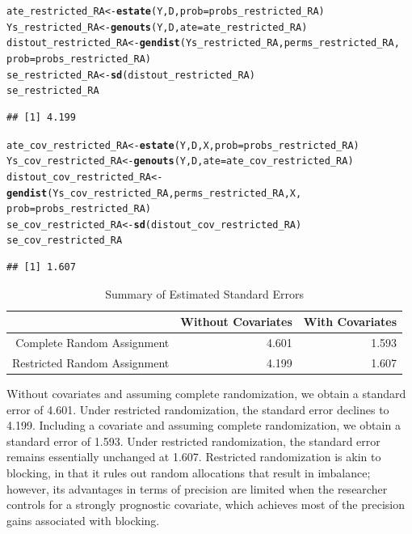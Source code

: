 \documentclass[11pt,notitlepage]{article}\usepackage[]{graphicx}\usepackage[]{color}
\makeatletter
\newcommand{\hlstd}[1]{\textcolor[rgb]{0.345,0.345,0.345}{#1}}%
\newcommand{\hlkwb}[1]{\textcolor[rgb]{0.69,0.353,0.396}{#1}}%
\newcommand{\hlkwc}[1]{\textcolor[rgb]{0.333,0.667,0.333}{#1}}%
\newcommand{\hlkwd}[1]{\textcolor[rgb]{0.737,0.353,0.396}{\textbf{#1}}}%
\newenvironment{kframe}{%
 \def\at@end@of@kframe{}%
 \ifinner\ifhmode%
  \def\at@end@of@kframe{\end{minipage}}%
  \begin{minipage}{\columnwidth}%
 \fi\fi%
 \def\FrameCommand##1{\hskip\@totalleftmargin \hskip-\fboxsep
 \colorbox{shadecolor}{##1}\hskip-\fboxsep
     \hskip-\linewidth \hskip-\@totalleftmargin \hskip\columnwidth}%
 \MakeFramed {\advance\hsize-\width
   \@totalleftmargin\z@ \linewidth\hsize
   \@setminipage}}%
 {\par\unskip\endMakeFramed%
 \at@end@of@kframe}
\newenvironment{knitrout}{}{} %
\makeatother
\begin{document}
\begin{enumerate}[a)]
\begin{knitrout}
\begin{kframe}
\begin{alltt}
\hlstd{ate_restricted_RA} \hlkwb{<-} \hlkwd{estate}\hlstd{(Y,D,}\hlkwc{prob}\hlstd{=probs_restricted_RA)}
\hlstd{Ys_restricted_RA} \hlkwb{<-} \hlkwd{genouts}\hlstd{(Y,D,}\hlkwc{ate}\hlstd{=ate_restricted_RA)}
\hlstd{distout_restricted_RA} \hlkwb{<-} \hlkwd{gendist}\hlstd{(Ys_restricted_RA,perms_restricted_RA,}
                                 \hlkwc{prob}\hlstd{=probs_restricted_RA)}
\hlstd{se_restricted_RA} \hlkwb{<-} \hlkwd{sd}\hlstd{(distout_restricted_RA)}
\hlstd{se_restricted_RA}
\end{alltt}
\begin{verbatim}
## [1] 4.199
\end{verbatim}
\begin{alltt}
\hlstd{ate_cov_restricted_RA} \hlkwb{<-} \hlkwd{estate}\hlstd{(Y,D,X,}\hlkwc{prob}\hlstd{=probs_restricted_RA)}
\hlstd{Ys_cov_restricted_RA} \hlkwb{<-} \hlkwd{genouts}\hlstd{(Y,D,}\hlkwc{ate}\hlstd{=ate_cov_restricted_RA)}
\hlstd{distout_cov_restricted_RA} \hlkwb{<-} \hlkwd{gendist}\hlstd{(Ys_cov_restricted_RA,perms_restricted_RA,X,}
                                     \hlkwc{prob}\hlstd{=probs_restricted_RA)}
\hlstd{se_cov_restricted_RA} \hlkwb{<-} \hlkwd{sd}\hlstd{(distout_cov_restricted_RA)}
\hlstd{se_cov_restricted_RA}
\end{alltt}
\begin{verbatim}
## [1] 1.607
\end{verbatim}
\end{kframe}
\end{knitrout}

\begin{table}[H]
\centering
\caption{Summary of Estimated Standard Errors} 
\begin{tabular}{rrr}
  \hline
 & Without Covariates & With Covariates \\ 
  \hline
Complete Random Assignment & 4.601 & 1.593 \\ 
  Restricted Random Assignment & 4.199 & 1.607 \\ 
   \hline
\end{tabular}
\end{table}


Without covariates and assuming complete randomization, we obtain a standard error of 4.601. Under restricted randomization, the standard error declines to 4.199.  Including a covariate and assuming complete randomization, we obtain a standard error of 1.593.  Under restricted randomization, the standard error remains essentially unchanged at 1.607. Restricted randomization is akin to blocking, in that it rules out random allocations that result in imbalance; however, its advantages in terms of precision are limited when the researcher controls for a strongly prognostic covariate, which achieves most of the precision gains associated with blocking. 

\end{enumerate}
\end{document}
